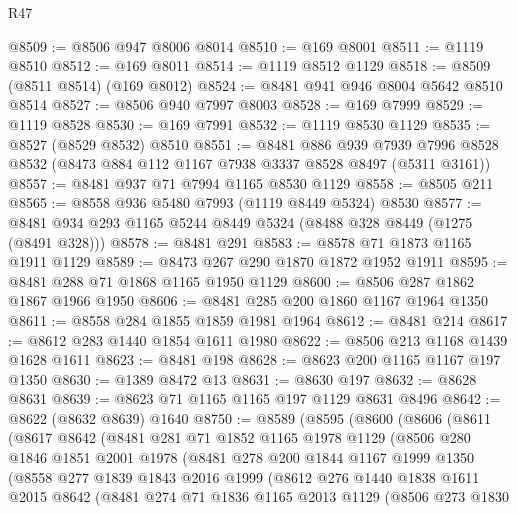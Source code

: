 \begin{lexlean}{R47}
\begin{coremodule}
@8509 := @8506 @947 @8006 @8014
@8510 := @169 @8001
@8511 := @1119 @8510
@8512 := @169 @8011
@8514 := @1119 @8512 @1129
@8518 := @8509 (@8511 @8514) (@169 @8012)
@8524 := @8481 @941 @946 @8004 @5642 @8510 @8514
@8527 := @8506 @940 @7997 @8003
@8528 := @169 @7999
@8529 := @1119 @8528
@8530 := @169 @7991
@8532 := @1119 @8530 @1129
@8535 := @8527 (@8529 @8532) @8510
@8551 := @8481
    @886
    @939
    @7939
    @7996
    @8528
    @8532
    (@8473 @884 @112 @1167 @7938 @3337 @8528 @8497 (@5311 @3161))
@8557 := @8481 @937 @71 @7994 @1165 @8530 @1129
@8558 := @8505 @211
@8565 := @8558 @936 @5480 @7993 (@1119 @8449 @5324) @8530
@8577 := @8481 @934 @293 @1165 @5244 @8449 @5324 (@8488 @328 @8449 (@1275 (@8491 @328)))
@8578 := @8481 @291
@8583 := @8578 @71 @1873 @1165 @1911 @1129
@8589 := @8473 @267 @290 @1870 @1872 @1952 @1911
@8595 := @8481 @288 @71 @1868 @1165 @1950 @1129
@8600 := @8506 @287 @1862 @1867 @1966 @1950
@8606 := @8481 @285 @200 @1860 @1167 @1964 @1350
@8611 := @8558 @284 @1855 @1859 @1981 @1964
@8612 := @8481 @214
@8617 := @8612 @283 @1440 @1854 @1611 @1980
@8622 := @8506 @213 @1168 @1439 @1628 @1611
@8623 := @8481 @198
@8628 := @8623 @200 @1165 @1167 @197 @1350
@8630 := @1389 @8472 @13
@8631 := @8630 @197
@8632 := @8628 @8631
@8639 := @8623 @71 @1165 @1165 @197 @1129 @8631 @8496
@8642 := @8622 (@8632 @8639) @1640
@8750 := @8589
    (@8595
      (@8600
        (@8606
          (@8611
            (@8617
              @8642
              (@8481
                @281
                @71
                @1852
                @1165
                @1978
                @1129
                (@8506
                  @280
                  @1846
                  @1851
                  @2001
                  @1978
                  (@8481
                    @278
                    @200
                    @1844
                    @1167
                    @1999
                    @1350
                    (@8558
                      @277
                      @1839
                      @1843
                      @2016
                      @1999
                      (@8612
                        @276
                        @1440
                        @1838
                        @1611
                        @2015
                        @8642
                        (@8481
                          @274
                          @71
                          @1836
                          @1165
                          @2013
                          @1129
                          (@8506
                            @273
                            @1830

\end{coremodule}
\end{lexlean}
